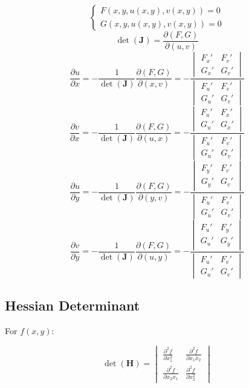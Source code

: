\documentclass{article}
\begin{document}
\[
    \begin{cases}
        F(x, y, u(x, y), v(x, y)) = 0 \\
        G(x, y, u(x, y), v(x, y)) = 0
    \end{cases}
\]
\[
    \det(\mathbf{J}) = \frac{\partial(F, G)}{\partial(u, v)}
\]
\[
    \frac{\partial u}{\partial x} = -\frac{1}{\det(\mathbf{J})} \frac{\partial(F, G)}{\partial(x, v)} = -\frac{\begin{vmatrix} F_x' & F_v' \\ G_x' & G_v' \end{vmatrix}}{\begin{vmatrix} F_u' & F_v' \\ G_u' & G_v' \end{vmatrix}}
\]
\[
    \frac{\partial v}{\partial x} = -\frac{1}{\det(\mathbf{J})} \frac{\partial(F, G)}{\partial(u, x)} = -\frac{\begin{vmatrix} F_u' & F_x' \\ G_u' & G_x' \end{vmatrix}}{\begin{vmatrix} F_u' & F_v' \\ G_u' & G_v' \end{vmatrix}}
\]
\[
    \frac{\partial u}{\partial y} = -\frac{1}{\det(\mathbf{J})} \frac{\partial(F, G)}{\partial(y, v)} = -\frac{\begin{vmatrix} F_y' & F_v' \\ G_y' & G_v' \end{vmatrix}}{\begin{vmatrix} F_u' & F_v' \\ G_u' & G_v' \end{vmatrix}}
\]
\[
    \frac{\partial v}{\partial y} = -\frac{1}{\det(\mathbf{J})} \frac{\partial(F, G)}{\partial(u, y)} = -\frac{\begin{vmatrix} F_u' & F_y' \\ G_u' & G_y' \end{vmatrix}}{\begin{vmatrix} F_u' & F_v' \\ G_u' & G_v' \end{vmatrix}}
\]

\subsection{Hessian Determinant}

For $f(x, y)$:

\[
    \det(\mathbf{H}) = \begin{vmatrix}
        \frac{\partial^2 f}{\partial x_1^2} & \frac{\partial^2 f}{\partial x_1 x_2} \\
        \frac{\partial^2 f}{\partial x_2 x_1} & \frac{\partial^2 f}{\partial x_2^2}
    \end{vmatrix}
\]
\end{document}
